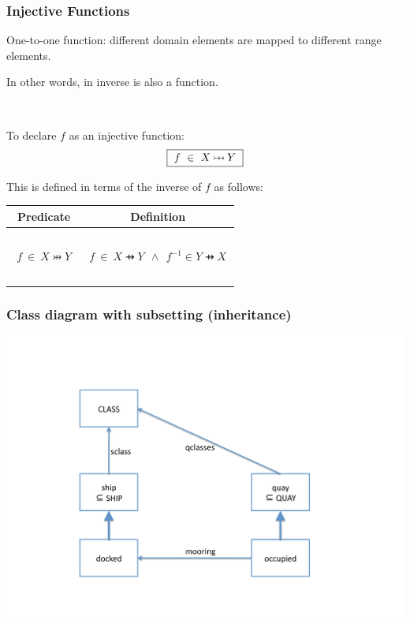 \documentclass{beamer}
\begin{document}
\begin{frame}

\frametitle{Injective Functions}

\alert{One-to-one} function:
different domain elements are mapped to different range elements. 

In other words, in \alert{inverse is also a function}.

~

To declare $f$ as an injective function:
\[
     \mbox{\fbox{$~f ~\in~ X\pinj Y~$}}
\]

This is defined in terms of the inverse of $f$ as follows:

\begin{center}
\begin{tabular}{|c|c|}
\hline
Predicate & Definition \\[2pt] \hline
~&\\
$~~f ~\in~ X\pinj Y~~$ &  $~f ~\in~ X\pfun Y ~~\land~~f^{-1} \in Y\pfun X~$  \\
~&\\ \hline\end{tabular}
\end{center}


\end{frame}




\begin{frame} \frametitle{Class diagram with subsetting (inheritance)}

  \begin{center}
    \includegraphics[scale=.5]{ship2.pdf}
  \end{center}

\end{frame}
\end{document}
